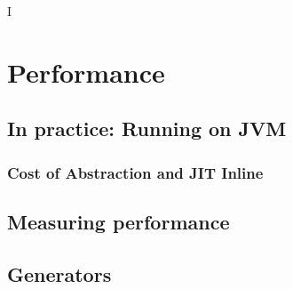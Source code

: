 I%

\chapter{Performance} %

\label{Performance} %



\section{In practice: Running on JVM}

\subsection{Cost of Abstraction and JIT Inline}


\section{Measuring performance}


\section{Generators}




